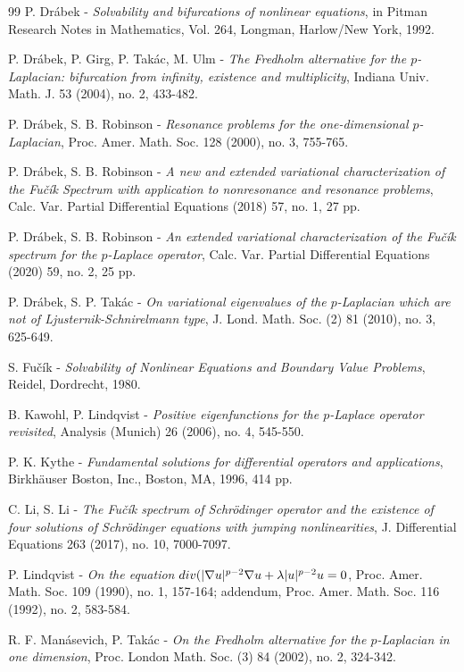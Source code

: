 \documentclass[a4paper,11pt]{article}
\begin{document}
{\begin{thebibliography}{99}
{P. Drábek} - \textit{Solvability and bifurcations of nonlinear equations}, in Pitman Research Notes in Mathematics, Vol. 264, Longman, Harlow/New York, 1992.

{P. Drábek, P. Girg, P. Takác, M. Ulm} - \textit{The Fredholm alternative for the $p$-Laplacian: bifurcation from infinity, existence and multiplicity}, Indiana Univ. Math. J. 53 (2004), no. 2, 433-482.

{P. Drábek, S. B. Robinson} - \textit{Resonance problems for the one-dimensional $p$-Laplacian}, Proc. Amer. Math. Soc. 128 (2000), no. 3, 755-765.

{P. Drábek, S. B. Robinson} - \textit{A new and extended variational characterization of the Fu\v cík Spectrum with application to nonresonance and resonance problems}, Calc. Var. Partial Differential Equations (2018) 57, no. 1, 27 pp.

{P. Drábek, S. B. Robinson} - \textit{An extended variational characterization of the Fu\v cík spectrum for the $p$-Laplace operator}, Calc. Var. Partial Differential Equations (2020) 59, no. 2, 25 pp.

{P. Drábek, S. P. Takác} - \textit{On variational eigenvalues of the $p$-Laplacian which are not of Ljusternik-Schnirelmann type}, J. Lond. Math. Soc. (2) 81 (2010), no. 3, 625-649.

{S. Fu\v cík} - \textit{Solvability of Nonlinear Equations and Boundary Value Problems}, Reidel, Dordrecht, 1980.

{B. Kawohl, P. Lindqvist} - \textit{Positive eigenfunctions for the $p$-Laplace operator revisited}, Analysis (Munich) 26 (2006), no. 4, 545-550.

{P. K. Kythe} - \textit{Fundamental solutions for differential operators and applications}, Birkh\"auser Boston, Inc., Boston, MA, 1996, 414 pp.

{C. Li, S. Li} - \textit{The Fu\v cík spectrum of Schrödinger operator and the existence of four solutions of Schr\"{o}dinger equations with jumping nonlinearities}, J. Differential Equations 263 (2017), no. 10, 7000-7097.

{P. Lindqvist} - \textit{On the equation ${\rm div}(|\nabla u|^{p-2} \nabla u + \lambda |u|^{p-2} u = 0$}, Proc. Amer. Math. Soc. 109 (1990), no. 1, 157-164; addendum, Proc. Amer. Math. Soc. 116 (1992), no. 2, 583-584.

{R. F. Manásevich, P. Takác} - \textit{On the Fredholm alternative for the $p$-Laplacian in one dimension}, Proc. London Math. Soc. (3) 84 (2002), no. 2, 324-342.


\end{thebibliography}}
\end{document}
